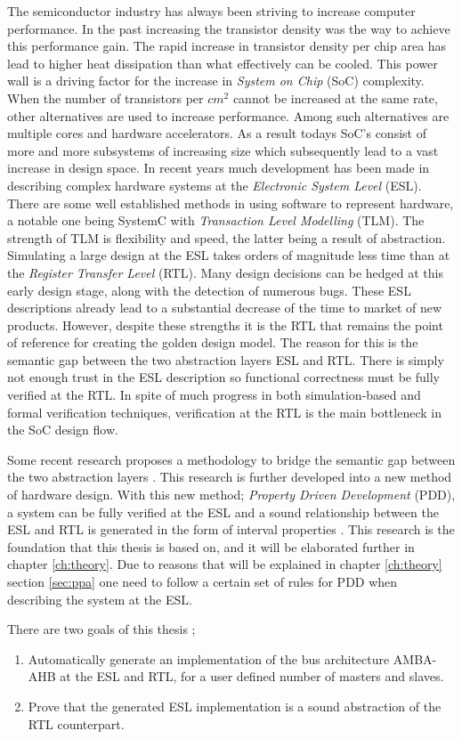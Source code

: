 The semiconductor industry has always been striving to increase computer performance. In the past increasing the transistor density was the way to achieve this performance gain. The rapid increase in transistor density per chip area has lead to higher heat dissipation than what effectively can be cooled. This power wall is a driving factor for the increase in \textit{System on Chip} (SoC) complexity. When the number of transistors per $cm^2$ cannot be increased at the same rate, other alternatives are used to increase performance. Among such alternatives are multiple cores and hardware accelerators. As a result todays SoC's consist of more and more subsystems of increasing size which subsequently lead to a vast increase in design space. In recent years much development has been made in describing complex hardware systems at the \textit{Electronic System Level} (ESL). There are some well established methods in using software to represent hardware, a notable one being SystemC with \textit{Transaction Level Modelling} (TLM). The strength of TLM is flexibility and speed, the latter being a result of abstraction. Simulating a large design at the ESL takes orders of magnitude less time than at the \textit{Register Transfer Level} (RTL). Many design decisions can be hedged at this early design stage, along with the detection of numerous bugs. These ESL descriptions already lead to a substantial decrease of the time to market of new products. However, despite these strengths it is the RTL that remains the point of reference for creating the golden design model. The reason for this is the semantic gap between the two abstraction layers ESL and RTL. There is simply not enough trust in the ESL description so functional correctness must be fully verified at the RTL. In spite of much progress in both simulation-based and formal verification techniques, verification at the RTL is the main bottleneck in the SoC design flow. \par

Some recent research proposes a methodology to bridge the semantic gap between the two abstraction layers \cite{2014-UrdahlStoffel.etal}. This research is further developed into a new method of hardware design. With this new method; \textit{Property Driven Development} (PDD), a system can be fully verified at the ESL and a sound relationship between the ESL and RTL is generated in the form of interval properties \cite{pddref}. This research is the foundation that this thesis is based on, and it will be elaborated further in chapter \ref{ch:theory}. Due to reasons that will be explained in chapter \ref{ch:theory} section \ref{sec:ppa} one need to follow a certain set of rules for PDD when describing the system at the ESL. \par 
There are two goals of this thesis ; \\
\begin{enumerate}
 \item Automatically generate an implementation of the bus architecture AMBA-AHB at the ESL and RTL, for a user defined number of masters and slaves.
 \item Prove that the generated ESL implementation is a sound abstraction of the RTL counterpart.
\end{enumerate}

